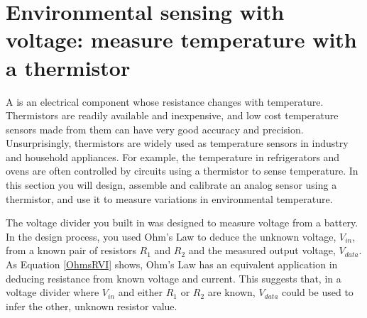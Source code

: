 %

\section{Environmental sensing with voltage: measure temperature with a thermistor}
A  is an electrical component whose resistance changes with temperature.
Thermistors are readily available and inexpensive, and low cost temperature sensors made from them can have very good accuracy and precision.
Unsurprisingly, thermistors are widely used as temperature sensors in industry and household appliances.
For example, the temperature in refrigerators and ovens are often controlled by circuits using a thermistor to sense temperature.
In this section you will design, assemble and calibrate an analog sensor using a thermistor, and use it to measure variations in environmental temperature.

The voltage divider you built in  was designed to measure voltage from a battery. %
In the design process, you used Ohm's Law to deduce the unknown voltage, $V_{in}$, from a known pair of resistors $R_1$ and $R_2$ and the measured output voltage, $V_{data}$.
As Equation \ref{OhmsRVI} shows, Ohm's Law has an equivalent application in deducing resistance from known voltage and current.
This suggests that, in a voltage divider where $V_{in}$ and either $R_1$ or $R_2$ are known, $V_{data}$ could be used to infer the other, unknown resistor value.

